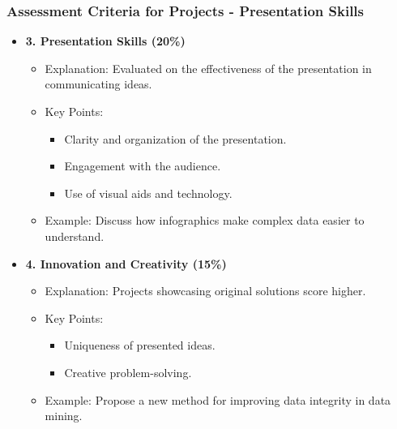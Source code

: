 \documentclass[aspectratio=169]{beamer}
\begin{document}
\begin{frame}[fragile]
    \frametitle{Assessment Criteria for Projects - Presentation Skills}
    \begin{itemize}
        \item \textbf{3. Presentation Skills (20\%)}
            \begin{itemize}
                \item Explanation: Evaluated on the effectiveness of the presentation in communicating ideas.
                \item Key Points:
                    \begin{itemize}
                        \item Clarity and organization of the presentation.
                        \item Engagement with the audience.
                        \item Use of visual aids and technology.
                    \end{itemize}
                \item Example: Discuss how infographics make complex data easier to understand.
            \end{itemize}

        \item \textbf{4. Innovation and Creativity (15\%)}
            \begin{itemize}
                \item Explanation: Projects showcasing original solutions score higher.
                \item Key Points:
                    \begin{itemize}
                        \item Uniqueness of presented ideas.
                        \item Creative problem-solving.
                    \end{itemize}
                \item Example: Propose a new method for improving data integrity in data mining.
            \end{itemize}
    \end{itemize}
\end{frame}
\end{document}
